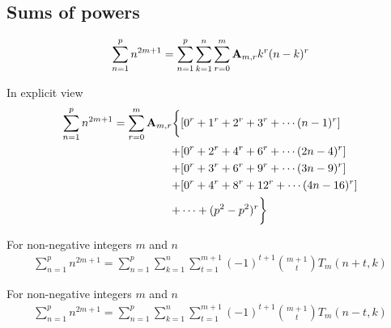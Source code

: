 \subsection{Sums of powers}\label{subsec:sums-of-powers}
\begin{proposition}
    \label{prop:sum-of-odd-powers}
    \begin{align*}
        \sum_{n=1}^{p} n^{2m+1} = \sum_{n=1}^{p} \sum_{k=1}^{n} \sum_{r=0}^{m} {\mathbf{A}} \sb{m,r} k^r (n-k)^r
    \end{align*}
\end{proposition}
In explicit view
\begin{align*}
    \sum_{n=1}^{p} n^{2m+1} = \sum_{r=0}^{m} {\mathbf{A}} \sb{m,r} \bigg \{
    &[0^r + 1^r + 2^r + 3^r + \cdots (n-1)^r] \\
    + &[0^r + 2^r + 4^r + 6^r + \cdots (2n-4)^r] \\
    + &[0^r + 3^r + 6^r + 9^r + \cdots (3n-9)^r] \\
    + &[0^r + 4^r + 8^r + 12^r + \cdots (4n-16)^r] \\
    + &\cdots + (p^2 - p^2)^r
    \bigg \}
\end{align*}

\begin{proposition}
    \label{prop:sum-odd-power-decomposition-forward}
    For non-negative integers $m$ and $n$
    \begin{align*}
        \sum_{n=1}^{p} n^{2m+1} = \sum_{n=1}^{p} \sum_{k=1}^{n} \sum_{t=1}^{m+1} (-1)^{t+1} \binom{m+1}{t} T_{m} (n+t, k)
    \end{align*}
\end{proposition}

\begin{proposition}
    \label{prop:sum-odd-power-decomposition-backward}
    For non-negative integers $m$ and $n$
    \begin{align*}
        \sum_{n=1}^{p} n^{2m+1} = \sum_{n=1}^{p} \sum_{k=1}^{n} \sum_{t=1}^{m+1} (-1)^{t+1} \binom{m+1}{t} T_{m} (n-t, k)
    \end{align*}
\end{proposition}
